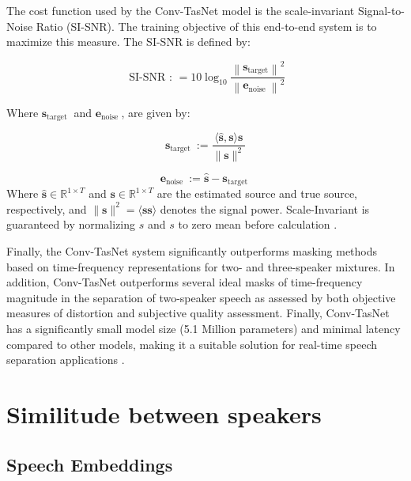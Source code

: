 \documentclass{article}
\begin{document}
The cost function used by the Conv-TasNet model is the scale-invariant Signal-to-Noise Ratio (SI-SNR). The training objective of this end-to-end system is to maximize this measure. The SI-SNR is defined by:

\begin{equation}
    \text{ SI-SNR : }=10 \log _{10} \frac{\left\|\mathbf{s}_{\text {target}}\right\|^{2}}{\left\|\mathbf{e}_{\text {noise }}\right\|^{2}}
\end{equation}

Where $\mathbf{s}_{\text {target }}$ and $\mathbf{e}_{\text {noise }}$,  are given by:

\begin{equation}
    \mathbf{s}_{\text {target }}:=\frac{\langle\hat{\mathbf{s}}, \mathbf{s}\rangle \mathbf{s}}{\|\mathbf{s}\|^{2}}
\end{equation}

\begin{equation}
    \mathbf{e}_{\text {noise }}:=\hat{\mathbf{s}}-\mathbf{s}_{\text {target }}
\end{equation}
Where $\hat{\mathbf{s}} \in \mathbb{R}^{1 \times T}$ and $\mathbf{s} \in \mathbb{R}^{1 \times T}$ are the estimated source and true source, respectively, and
$\|\mathbf{s}\|^{2}=\langle\mathbf{s}\mathbf{s}\rangle$ denotes the signal power. Scale-Invariant is guaranteed by normalizing $\hat{s}$ and $s$ to zero mean before calculation \cite{luo2019conv}.

Finally, the Conv-TasNet system significantly outperforms masking methods based on time-frequency representations for two- and three-speaker mixtures. In addition, Conv-TasNet outperforms several ideal masks of time-frequency magnitude in the separation of two-speaker speech as assessed by both objective measures of distortion and subjective quality assessment. Finally, Conv-TasNet has a significantly small model size (5.1 Million parameters) and minimal latency compared to other models, making it a suitable solution for real-time speech separation applications \cite{luo2019conv}.




\section{Similitude between speakers}

\subsection{Speech Embeddings}
\end{document}
